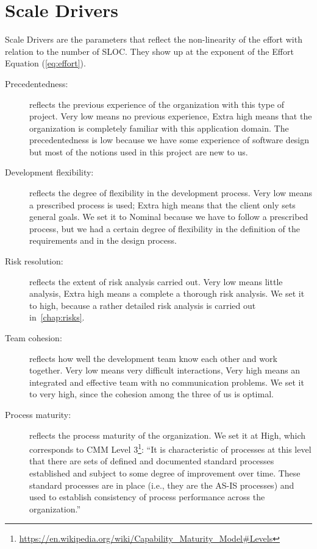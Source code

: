 \section{Scale Drivers}

Scale Drivers are the parameters that reflect the non-linearity of the effort with relation to the number of SLOC. They show up at the exponent of the Effort Equation (\autoref{eq:effort}).

\begin{description}

    \item[Precedentedness:] reflects the previous experience of the organization with this type of project. Very low means no previous experience, Extra high means that the organization is completely familiar with this application domain.
    The precedentedness is low because we have some experience of software design but most of the notions used in this project are new to us.

    \item[Development flexibility:] reflects the degree of flexibility in the development process. Very low means a prescribed process is used; Extra high means that the client only sets general goals. We set it to Nominal because we have to follow a prescribed process, but we had a certain degree of flexibility in the definition of the requirements and in the design process.

    \item[Risk resolution:] reflects the extent of risk analysis carried out. Very low means little analysis, Extra high means a complete a thorough risk analysis. We set it to high, because a rather detailed risk analysis is carried out in~\autoref{chap:risks}.

    \item[Team cohesion:] reflects how well the development team know each other and work together. Very low means very difficult interactions, Very high means an integrated and effective team with no communication problems. We set it to very high, since the cohesion among the three of us is optimal.

    \item[Process maturity:] reflects the process maturity of the organization. We set it at High, which corresponds to CMM Level 3\footnote{\url{https://en.wikipedia.org/wiki/Capability_Maturity_Model\#Levels}}: ``It is characteristic of processes at this level that there are sets of defined and documented standard processes established and subject to some degree of improvement over time. These standard processes are in place (i.e., they are the AS-IS processes) and used to establish consistency of process performance across the organization.''

\end{description}

